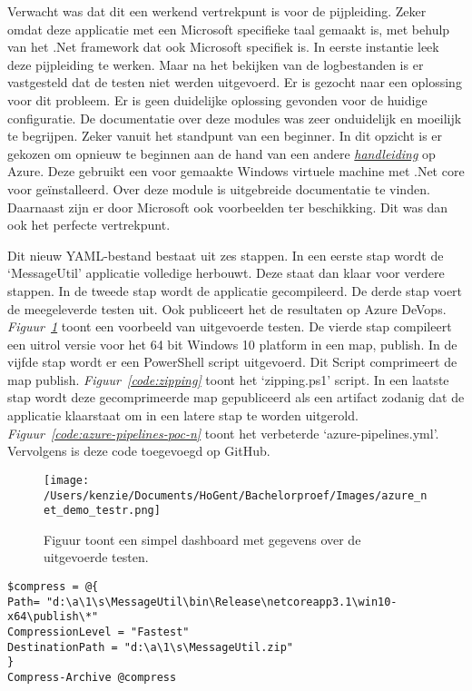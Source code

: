 Verwacht was dat dit een werkend vertrekpunt is voor de pijpleiding. Zeker omdat deze applicatie met een Microsoft specifieke taal gemaakt is, met behulp van het .Net framework dat ook Microsoft specifiek is. In eerste instantie leek deze pijpleiding te werken. Maar na het bekijken van de logbestanden is er vastgesteld dat de testen niet werden uitgevoerd. Er is gezocht naar een oplossing voor dit probleem. Er is geen duidelijke oplossing gevonden voor de huidige configuratie. De documentatie over deze modules was zeer onduidelijk en moeilijk te begrijpen. Zeker vanuit het standpunt van een beginner. In dit opzicht is er gekozen om opnieuw te beginnen aan de hand van een andere \emph{\href{https://docs.microsoft.com/en-us/azure/devops/pipelines/ecosystems/dotnet-core?view=azure-devops}{handleiding}} op Azure. Deze gebruikt een voor gemaakte Windows virtuele machine met .Net core voor geïnstalleerd. Over deze module is uitgebreide documentatie te vinden. Daarnaast zijn er door Microsoft ook voorbeelden ter beschikking. Dit was dan ook het perfecte vertrekpunt.

Dit nieuw YAML-bestand bestaat uit zes stappen. In een eerste stap wordt de ‘MessageUtil’ applicatie volledige herbouwt. Deze staat dan klaar voor verdere stappen. In de tweede stap wordt de applicatie gecompileerd. De derde stap voert de meegeleverde testen uit. Ook publiceert het de resultaten op Azure DeVops. \emph{Figuur~\ref{fig:Azure_POC_testr}} toont een voorbeeld van uitgevoerde testen. De vierde stap compileert een uitrol versie voor het 64 bit Windows 10 platform in een map, publish. In de vijfde stap wordt er een PowerShell script uitgevoerd. Dit Script comprimeert de map publish. \emph{Figuur~\ref{code:zipping}} toont het ‘zipping.ps1’ script. In een laatste stap wordt deze gecomprimeerde map gepubliceerd als een artifact zodanig dat de applicatie klaarstaat om in een latere stap te worden uitgerold. \emph{Figuur~\ref{code:azure-pipelines-poc-n}} toont het verbeterde ‘azure-pipelines.yml’. Vervolgens is deze code toegevoegd op GitHub.

\begin{figure}[!htbp]
    \centering
    \texttt{[image: /Users/kenzie/Documents/HoGent/Bachelorproef/Images/azure\_net\_demo\_testr.png]}
    \caption{Figuur toont een simpel dashboard met gegevens over de uitgevoerde testen.}
    \label{fig:Azure_POC_testr}
\end{figure}

\begin{lstlisting}
$compress = @{
Path= "d:\a\1\s\MessageUtil\bin\Release\netcoreapp3.1\win10-x64\publish\*"
CompressionLevel = "Fastest"
DestinationPath = "d:\a\1\s\MessageUtil.zip"
}
Compress-Archive @compress
\end{lstlisting}


